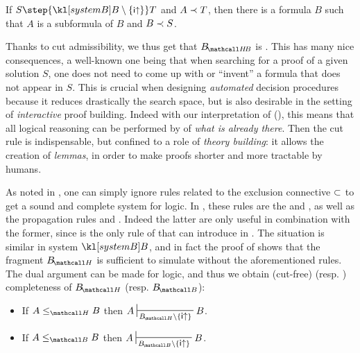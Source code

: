\begin{fact}\label{cor:subformula-property} If $S
  \step{\sysB \setminus \{\rsf{i{\ua}}\}} T$ and $A \prec T$, then there is a
  formula $B$ such that $A$ is a subformula of $B$ and $B \prec S$.
\end{fact}

Thanks to cut admissibility, we thus get that $\sysBHB$ is \emph{}. This
has many nice consequences, a well-known one being that when searching for a
proof of a given solution $S$, one does not need to come up with or ``invent'' a
formula that does not appear in $S$. This is crucial when designing
\emph{automated} decision procedures because it reduces drastically the search
space, but is also desirable in the setting of \emph{interactive} proof
building. Indeed with our  interpretation of 
(), this means that all logical reasoning can be performed
by  of \emph{what is already there}. Then the cut rule is
indispensable, but confined to a role of \emph{theory building}: it allows the
creation of \emph{lemmas}, in order to make proofs shorter and more tractable by
humans.

As noted in \cite{postniece_deep_2009}, one can simply ignore rules related to
the exclusion connective $\subset$ to get a sound and complete system for
 logic. In , these rules are the 
 and , as well as the propagation rules
 and . Indeed the latter are only useful in
combination with the former, since  is the only rule of
 that can introduce  in  . The
situation is similar in system $\sysB$, and in fact the proof of
 shows that the  fragment $\sysBH$ is
sufficient to simulate  without the aforementioned rules. The dual
argument can be made for  logic, and thus we obtain
(cut-free)  (resp. ) completeness of $\sysBH$
(resp. $\sysBB$):

\begin{corollary}
  \sbr
  \begin{itemize}
    \item If $A \sementH B$ then $A \prov{\sysBH \setminus
    \{\rsf{i{\ua}}\}} B$.
    \item If $A \sementB B$ then $A \prov{\sysBB \setminus
    \{\rsf{i{\ua}}\}} B$.
  \end{itemize}
\end{corollary}

